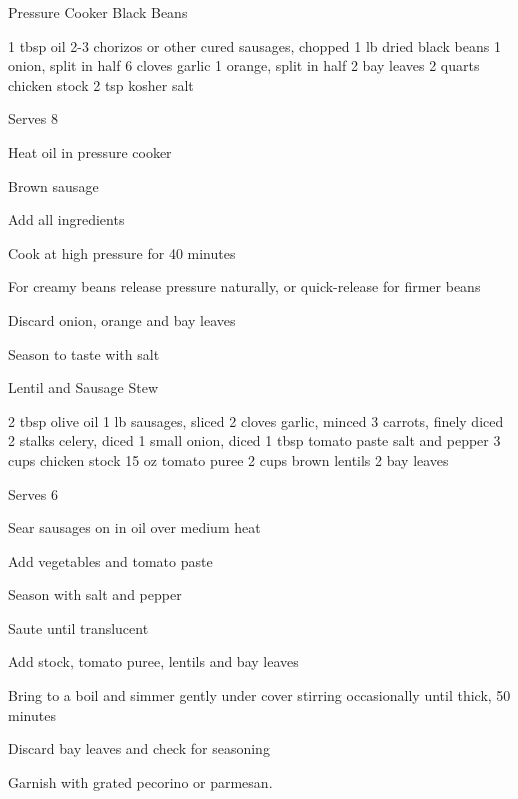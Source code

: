 \begin{recipe}{Pressure Cooker Black Beans}{}
\begin{ingredients}
1 tbsp oil
2-3 chorizos or other cured sausages, \ibreak chopped
1 lb dried black beans
1 onion, split in half
6 cloves garlic
1 orange, split in half
2 bay leaves
2 quarts chicken stock
2 tsp kosher salt
\end{ingredients}
\nextcolumn
Serves 8
\begin{steps}
    \item Heat oil in pressure cooker
    \item Brown sausage
    \item Add all ingredients
    \item Cook at high pressure for 40 minutes
    \item For creamy beans release pressure naturally, or quick-release for firmer beans
    \item Discard onion, orange and bay leaves
    \item Season to taste with salt
\end{steps}
\end{recipe}

\begin{denserecipe}{Lentil and Sausage Stew}{}
\begin{ingredients}
2 tbsp olive oil
1 lb sausages, sliced
2 cloves garlic, minced
3 carrots, finely diced
2 stalks celery, diced
1 small onion, diced
1 tbsp tomato paste
salt and pepper
3 cups chicken stock
15 oz tomato puree
2 cups brown lentils
2 bay leaves
\end{ingredients}
\nextcolumn
Serves 6
\begin{steps}
    \item Sear sausages on in oil over medium heat
    \item Add vegetables and tomato paste
    \item Season with salt and pepper
    \item Saute until translucent
    \item Add stock, tomato puree, lentils and bay leaves
    \item Bring to a boil and simmer gently under cover stirring occasionally until thick, 50 minutes
    \item Discard bay leaves and check for seasoning
\end{steps}
Garnish with grated pecorino or parmesan.
\end{denserecipe}

